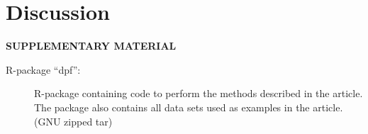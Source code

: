 \documentclass[12pt]{article}
\begin{document}
\section{Discussion}
\label{sec:discussion}




\bigskip
\begin{center}
{\large\bf SUPPLEMENTARY MATERIAL}
\end{center}

\begin{description}

\item[R-package ``dpf'':] R-package containing code to perform the
  methods described in the article. The package also contains all data
  sets used as examples in the article. (GNU zipped tar)

\end{description}






\end{document}
